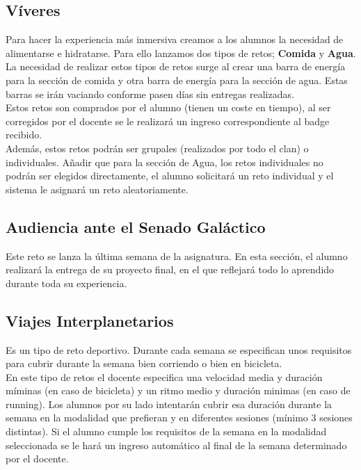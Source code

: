 \subsection{Víveres}
Para hacer la experiencia más inmersiva creamos a los alumnos la necesidad de alimentarse e hidratarse. Para ello lanzamos dos tipos de retos; \textbf{Comida} y \textbf{Agua}. La necesidad de realizar estos tipos de retos surge al crear una barra de energía para la sección de comida y otra barra de energía para la sección de agua. Estas barras se irán vaciando conforme pasen días sin entregas realizadas.\\

Estos retos son comprados por el alumno (tienen un coste en tiempo), al ser corregidos por el docente se le realizará un ingreso correspondiente al badge recibido.\\

Además, estos retos podrán ser grupales (realizados por todo el clan) o individuales. Añadir que para la sección de Agua, los retos individuales no podrán ser elegidos directamente, el alumno solicitará un reto individual y el sistema le asignará un reto aleatoriamente.

\subsection{Audiencia ante el Senado Galáctico}
Este reto se lanza la última semana de la asignatura. En esta sección, el alumno realizará la entrega de su proyecto final, en el que reflejará todo lo aprendido durante toda su experiencia.

\subsection{Viajes Interplanetarios}
Es un tipo de reto deportivo. Durante cada semana se especifican unos requisitos para cubrir durante la semana bien corriendo o bien en bicicleta.\\

En este tipo de retos el docente especifica una velocidad media y duración míminas (en caso de bicicleta) y un ritmo medio y duración minimas (en caso de running). Los alumnos por su lado intentarán cubrir esa duración durante la semana en la modalidad que prefieran y en diferentes sesiones (mínimo 3 sesiones distintas). Si el alumno cumple los requisitos de la semana en la modalidad seleccionada se le hará un ingreso automático al final de la semana determinado por el docente.

